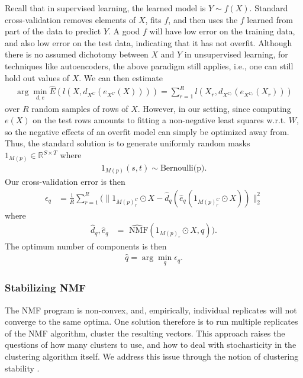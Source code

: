 Recall that in supervised learning, the learned model is $Y \sim f(X)$.
Standard cross-validation removes elements of $X$, fits $f$, and then uses the $f$ learned from part of the data to predict $Y$.
A good $f$ will have low error on the training data, and also low error on the test data, indicating that it has not overfit.
Although there is no assumed dichotomy between $X$ and $Y$ in unsupervised learning, for techniques like autoencoders, the above paradigm still applies, i.e., one can still hold out values of $X$.
We can then estimate 
\begin{align*}
\arg \min_{d,e} \widehat E(l(X, d_{X^C}(e_{X^C}(X)))) = \sum_{r=  1}^R l(X_r, d_{X^{C_r}}(e_{X^{C_r}}(X_r)))
\end{align*}
over $R$ random samples of rows of $X$.
However, in our setting, since computing $e(X)$ on the test rows amounts to fitting a non-negative least squares w.r.t. $W$, so the negative effects of an overfit model can simply be optimized away from.
Thus,  the standard solution is to generate uniformly random masks $1_{M(p)} \in \mathbb R^{S \times T}$ where
\begin{align*}
1_{M(p)} (s,t) \sim \text{Bernoulli(p)}.
\end{align*}
Our cross-validation error is then
\begin{align*}
\epsilon_q &= \frac{1}{R} \sum_{r = 1}^R (\|1_{M(p)_r^C} \odot X - \widehat d_q(\widehat e_q (1_{M(p)_r^C} \odot X ))\|_2^2 
\end{align*}
where
\begin{align*}
\widehat d_q, \widehat e_q &= \widehat{\text{ NMF}}(1_{M(p)_r} \odot X, q)).
\end{align*}
The optimum number of components is then
\begin{align*}
    \widehat q = \arg \min_q \epsilon_q.
\end{align*}

\subsubsection{Stabilizing NMF}

The NMF program is non-convex, and, empirically, individual replicates will not converge to the same optima.
One solution therefore is to run multiple replicates of the NMF algorithm, cluster the resulting vectors.
This approach raises the questions of how many clusters to use, and how to deal with stochasticity in the clustering algorithm itself.
We address this issue through the notion of clustering stability \citep{Von_Luxburg2010-lu}.

